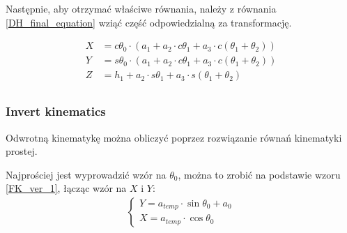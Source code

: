 \documentclass[a4paper,13pt]{article}
\begin{document}

Następnie, aby otrzymać właściwe równania, należy z równania \ref{DH_final_equation} wziąć część odpowiedzialną za transformację.

\begin{equation}
\begin{split}
X &= c\theta_0 \cdot \left( a_1 + a_2 \cdot c\theta_1 + a_3  \cdot c\left( \theta_1 + \theta_2 \right) \right)\\
Y &= s\theta_0 \cdot \left( a_1 + a_2 \cdot c\theta_1 + a_3  \cdot c\left( \theta_1 + \theta_2 \right) \right)\\
Z &= h_1 + a_2 \cdot s\theta_1 + a_3 \cdot s\left( \theta_1 + \theta_2 \right)\\
\end{split}
\end{equation}



\subsubsection{Invert kinematics}
Odwrotną kinematykę można obliczyć poprzez rozwiązanie równań kinematyki prostej.

Najprościej jest wyprowadzić wzór na $\theta_0$, można to zrobić na podstawie wzoru \ref{FK_ver_1}, łącząc wzór na $X$ i $Y$:
\begin{equation}
\begin{split}
\begin{cases}
Y = a_{temp} \cdot \sin{\theta_0} + a_0\\
X = a_{temp} \cdot \cos{\theta_0}
\end{cases}
\end{split}
\end{equation}
\end{document}
